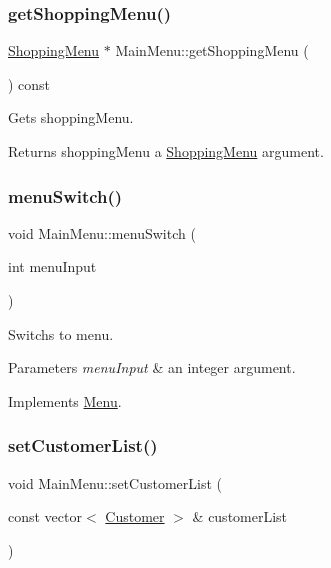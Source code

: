 \subsubsection{\texorpdfstring{get\+Shopping\+Menu()}{getShoppingMenu()}}
{\footnotesize\ttfamily \hyperlink{classShoppingMenu}{Shopping\+Menu} $\ast$ Main\+Menu\+::get\+Shopping\+Menu (\begin{DoxyParamCaption}{ }\end{DoxyParamCaption}) const}



Gets shopping\+Menu. 

\begin{DoxyReturn}{Returns}
shopping\+Menu a \hyperlink{classShoppingMenu}{Shopping\+Menu} argument. 
\end{DoxyReturn}
\mbox{\label{classMainMenu_aabbf0c8aba7bc80316e150ea609e897f}} 
\subsubsection{\texorpdfstring{menu\+Switch()}{menuSwitch()}}
{\footnotesize\ttfamily void Main\+Menu\+::menu\+Switch (\begin{DoxyParamCaption}\item[{int}]{menu\+Input }\end{DoxyParamCaption})\hspace{0.3cm}{\ttfamily [virtual]}}



Switchs to menu. 


\begin{DoxyParams}{Parameters}
{\em menu\+Input} & an integer argument. \\
\hline
\end{DoxyParams}


Implements \hyperlink{classMenu_ae9d7af36b1a380e5e4b03ddbef9ceeca}{Menu}.

\mbox{\label{classMainMenu_aa78eaffbe8203475575aac6f330497c9}} 
\subsubsection{\texorpdfstring{set\+Customer\+List()}{setCustomerList()}}
{\footnotesize\ttfamily void Main\+Menu\+::set\+Customer\+List (\begin{DoxyParamCaption}\item[{const vector$<$ \hyperlink{classCustomer}{Customer} $>$ \&}]{customer\+List }\end{DoxyParamCaption})}



